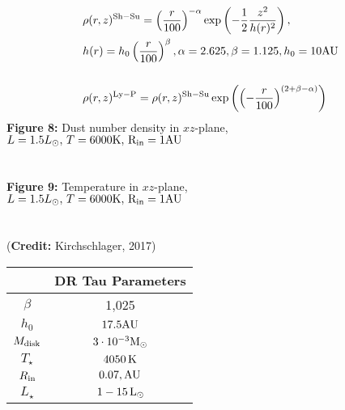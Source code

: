 \begin{equation}
\begin{split}
	    &\rho (r,z)^{\rm{Sh-Su}} = {\left(\frac{r}{100}\right)}^{-\alpha}\exp\left({-\frac{1}{2}{\frac{z^2}{h(r)^2}}}\right), \\
	    &h(r) = h_0 \left(\frac{r}{100}\right)^{\beta}, \alpha = 2.625, \beta=1.125, h_0 = 10 \rm{AU} \\
	    \\
	    &\rho (r,z)^{\rm{Ly-P}} = \rho (r,z)^{\rm{Sh-Su}}\exp\left({{\left(-\frac{r}{100}\right)}^{(2+\beta-\alpha)}}\right)
\end{split}
\end{equation}
%
\textbf{Figure 8:} Dust number density in $xz$-plane, \\
$L = 1.5 L_{\odot}, \, T = 6000 \rm{K}, \, R_{\rm{in}} = 1 \rm{AU}$ \\
\\
\\
%
\textbf{Figure 9:} Temperature in $xz$-plane, \\
$L = 1.5 L_{\odot}, \, T = 6000 \rm{K}, \, R_{\rm{in}} = 1 \rm{AU}$ \\
\\
\\

(\textbf{Credit: } Kirchschlager, 2017)

\begin{table}[h!]
	\begin{center}
 		\begin{tabular}{|c | c |} 
		\hline
		& DR Tau Parameters \\
		\hline
		$\beta$ & 1,025\\
		\hline
		$h_0$ & $17.5 \rm{AU}$\\
		\hline
		$M_{\rm{disk}}$ & $ 3 \cdot 10^{-3}  \rm{M_{\odot}}$\\
		\hline
		$T_{\star}$ & $4050\, \rm{K}$\\
		\hline
		$R_{\rm{in}}$ & $0.07, \rm{AU}$\\
		\hline
		$L_{\star}$ &  $1 -15\, \rm{L_{\odot}}$ \\
		\hline
		\end{tabular}
	\end{center}
\end{table}



